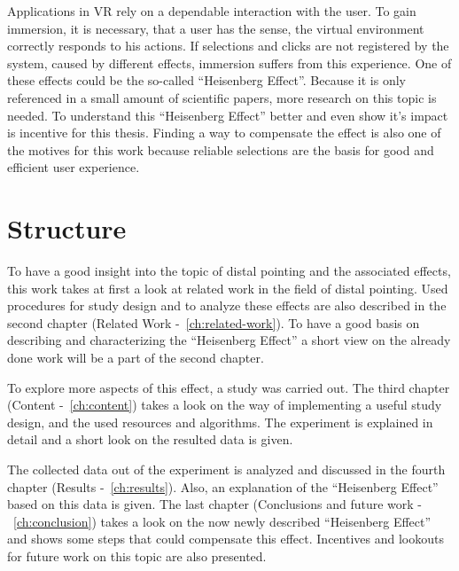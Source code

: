 Applications in VR rely on a dependable interaction with the user. To gain immersion, it is necessary, that a user has the sense, the virtual environment correctly responds to his actions. If selections and clicks are not registered by the system, caused by different effects, immersion suffers from this experience. One of these effects could be the so-called ``Heisenberg Effect''. Because it is only referenced in a small amount of scientific papers, more research on this topic is needed. To understand this ``Heisenberg Effect'' better and even show it's impact is incentive for this thesis. Finding a way to compensate the effect is also one of the motives for this work because reliable selections are the basis for good and efficient user experience.

\section{Structure}

To have a good insight into the topic of distal pointing and the associated effects, this work takes at first a look at related work in the field of distal pointing. Used procedures for study design and to analyze these effects are also described in the second chapter (Related Work -~\ref{ch:related-work}). To have a good basis on describing and characterizing the ``Heisenberg Effect'' a short view on the already done work will be a part of the second chapter. 

To explore more aspects of this effect, a study was carried out. The third chapter (Content -~\ref{ch:content}) takes a look on the way of implementing a useful study design, and the used resources and algorithms. The experiment is explained in detail and a short look on the resulted data is given.

The collected data out of the experiment is analyzed and discussed in the fourth chapter (Results -~\ref{ch:results}). Also, an explanation of the ``Heisenberg Effect'' based on this data is given. The last chapter (Conclusions and future work -~\ref{ch:conclusion}) takes a look on the now newly described ``Heisenberg Effect'' and shows some steps that could compensate this effect. Incentives and lookouts for future work on this topic are also presented.